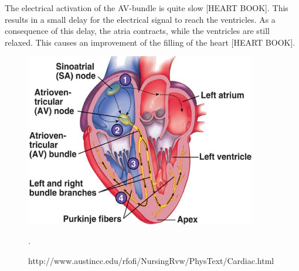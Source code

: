 The electrical activation of the AV-bundle is quite slow [HEART BOOK]. This results in a small delay for the electrical signal to reach the ventricles. As a consequence of this delay, the atria contracts, while the ventricles are still relaxed. This causes an improvement of the filling of the heart [HEART BOOK].


\begin{figure}[h]
 \centering 
     \includegraphics[width=0.9\textwidth]{bilder/b_electrical_heart}
     \caption{http://www.austincc.edu/rfofi/NursingRvw/PhysText/Cardiac.html}.
     \label{b_electrical_heart.png}
\end{figure}













